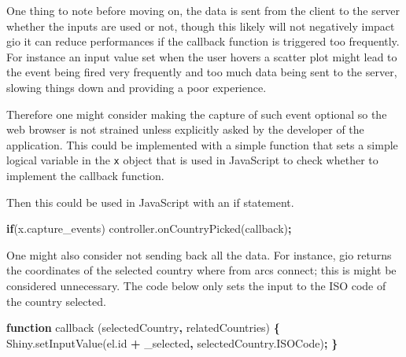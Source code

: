 \documentclass[
]{krantz}
\makeatletter
\newenvironment{Shaded}{\begin{snugshade}}{\end{snugshade}}
\newcommand{\AttributeTok}[1]{\textcolor[rgb]{0.61,0.61,0.61}{#1}}
\newcommand{\CommentTok}[1]{\textcolor[rgb]{0.37,0.37,0.37}{\textit{#1}}}
\newcommand{\ControlFlowTok}[1]{\textcolor[rgb]{0.27,0.27,0.27}{\textbf{#1}}}
\newcommand{\KeywordTok}[1]{\textcolor[rgb]{0.27,0.27,0.27}{\textbf{#1}}}
\newcommand{\NormalTok}[1]{#1}
\newcommand{\OperatorTok}[1]{\textcolor[rgb]{0.43,0.43,0.43}{\textbf{#1}}}
\newcommand{\OtherTok}[1]{\textcolor[rgb]{0.37,0.37,0.37}{#1}}
\newcommand{\StringTok}[1]{\textcolor[rgb]{0.5,0.5,0.5}{#1}}
\newcommand{\VariableTok}[1]{\textcolor[rgb]{0,0,0}{#1}}
\newenvironment{kframe}{%
\medskip{}
\setlength{\fboxsep}{.8em}
 \def\at@end@of@kframe{}%
 \ifinner\ifhmode%
  \def\at@end@of@kframe{\end{minipage}}%
  \begin{minipage}{\columnwidth}%
 \fi\fi%
 \def\FrameCommand##1{\hskip\@totalleftmargin \hskip-\fboxsep
 \colorbox{shadecolor}{##1}\hskip-\fboxsep
     \hskip-\linewidth \hskip-\@totalleftmargin \hskip\columnwidth}%
 \MakeFramed {\advance\hsize-\width
   \@totalleftmargin\z@ \linewidth\hsize
   \@setminipage}}%
 {\par\unskip\endMakeFramed%
 \at@end@of@kframe}
\renewenvironment{Shaded}{\begin{kframe}}{\end{kframe}}
\makeatother
\begin{document}
One thing to note before moving on, the data is sent from the client to the server whether the inputs are used or not, though this likely will not negatively impact gio it can reduce performances if the callback function is triggered too frequently. For instance an input value set when the user hovers a scatter plot might lead to the event being fired very frequently and too much data being sent to the server, slowing things down and providing a poor experience.

Therefore one might consider making the capture of such event optional so the web browser is not strained unless explicitly asked by the developer of the application. This could be implemented with a simple function that sets a simple logical variable in the \texttt{x} object that is used in JavaScript to check whether to implement the callback function.

\begin{Shaded}
\end{Shaded}

Then this could be used in JavaScript with an if statement.

\begin{Shaded}
\begin{Highlighting}[]
\ControlFlowTok{if}\NormalTok{(}\VariableTok{x}\NormalTok{.}\AttributeTok{capture\_events}\NormalTok{)}
  \VariableTok{controller}\NormalTok{.}\AttributeTok{onCountryPicked}\NormalTok{(callback)}\OperatorTok{;}
\end{Highlighting}
\end{Shaded}

One might also consider not sending back all the data. For instance, gio returns the coordinates of the selected country where from arcs connect; this is might be considered unnecessary. The code below only sets the input to the ISO code of the country selected.

\begin{Shaded}
\begin{Highlighting}[]
\KeywordTok{function} \AttributeTok{callback}\NormalTok{ (selectedCountry}\OperatorTok{,}\NormalTok{ relatedCountries) }\OperatorTok{\{}
  \VariableTok{Shiny}\NormalTok{.}\AttributeTok{setInputValue}\NormalTok{(}\VariableTok{el}\NormalTok{.}\AttributeTok{id} \OperatorTok{+} \StringTok{\textquotesingle{}\_selected\textquotesingle{}}\OperatorTok{,} \VariableTok{selectedCountry}\NormalTok{.}\AttributeTok{ISOCode}\NormalTok{)}\OperatorTok{;}
\OperatorTok{\}}
\end{Highlighting}
\end{Shaded}
\end{document}
